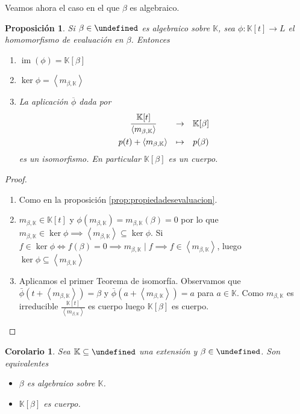 \documentclass[10pt, spanish]{report}
\newtheorem{prop}[tma]{Proposición}
\newtheorem{cor}{Corolario}[tma]
\theoremstyle{definition}
\theoremstyle{custom}
\theoremstyle{remark}
\newcommand{\K}{\mathbb{K}}
\let\L\undefined
\newcommand{\L}{\mathbb{L}}
\newcommand{\im}[1]{\operatorname{im}\left(#1\right)}
\begin{document}
Veamos ahora el caso en el que $\beta$ es algebraico.

\begin{prop}\label{prop:propiedadesevaluacionalg}
    Si $\beta\in\L$ es algebraico sobre $\K$, sea $\phi:\K[t]\to L$ el
    homomorfismo de evaluación en $\beta$. Entonces
    \begin{enumerate}
        \item $\im{\phi}=\K[\beta]$
        \item $\ker{\phi}=\left<m_{\beta,\K}\right>$
        \item La aplicación $\overline{\phi}$ dada por
            \[\begin{matrix*}
                \cfrac{\K[t]}{\left<m_{\beta,\K}\right>}&\to&\K[\beta]\\[1em]
                p(t)+\left< m_{\beta,\K} \right>&\mapsto&p(\beta)
            \end{matrix*}\]
            es un isomorfismo. En particular $\K[\beta]$ es un cuerpo.
    \end{enumerate}
\end{prop}

\begin{proof}\hspace{0pt}
    \begin{enumerate}
        \item Como en la proposición \ref{prop:propiedadesevaluacion}.
        \item $m_{\beta,\K}\in\K[t]$ y $\phi(m_{\beta,\K})=m_{\beta,\K}(\beta)
            =0$ por lo que $m_{\beta,\K}\in \ker{\phi} \implies \left<
            m_{\beta,\K} \right> \subseteq \ker{\phi}$. Si $f\in\ker{\phi}
            \Leftrightarrow f(\beta)=0 \implies m_{\beta,\K}\mid f \implies f\in
            \left< m_{\beta,\K}\right> $, luego $\ker{\phi}\subseteq\left<
            m_{\beta,\K} \right> $
        \item Aplicamos el primer Teorema de isomorfía. Observamos que
            $\bar{\phi}(t+\left< m_{\beta,\K} \right>)=\beta$ y
            $\bar{\phi}(a+\left< m_{\beta,\K} \right>)=a$ para $a\in\K$. Como
            $m_{\beta,\K}$ es irreducible $\frac{\K[t]}{\left< m_{\beta,\K}
            \right> }$ es cuerpo luego $\K[\beta]$ es cuerpo.
    \end{enumerate}
    \vspace{-1.75em}
\end{proof}

\begin{cor}\label{cor:carcuerposelalg}
    Sea $\K\subseteq\L$ una extensión y $\beta\in \L$. Son equivalentes
    \begin{itemize}
        \item $\beta$ es algebraico sobre $\K$.
        \item $\K[\beta]$ es cuerpo.
    \end{itemize}
\end{cor}
\end{document}
